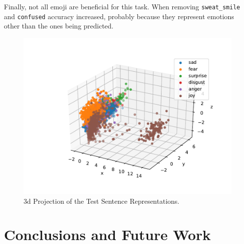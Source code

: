 \documentclass[11pt,a4paper]{article}
\begin{document}
Finally, not all emoji are beneficial for this task. When removing
\texttt{sweat\_smile} and \texttt{confused} accuracy increased, probably because
they represent emotions other than the ones being predicted.




\begin{figure}[!h]
    \centering
    \includegraphics[width=\columnwidth]{images/pca.pdf}

    \caption{3d Projection of the Test Sentence Representations.}
    \label{fig:pca}
\end{figure}

\section{Conclusions and Future Work}
\end{document}
